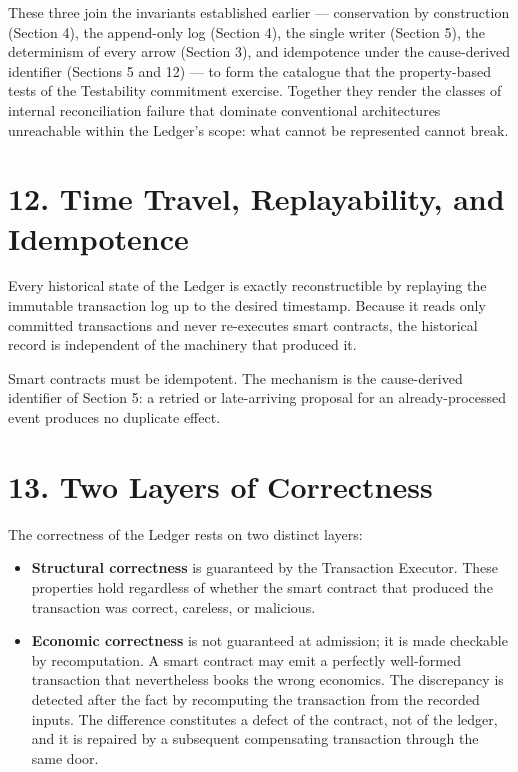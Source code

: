 \documentclass[11pt,a4paper]{article}
\providecommand{\tightlist}{\setlength{\itemsep}{2pt}\setlength{\parskip}{0pt}}
\begin{document}
These three join the invariants established earlier --- conservation by
construction (Section 4), the append-only log (Section 4), the single
writer (Section 5), the determinism of every arrow (Section 3), and
idempotence under the cause-derived identifier (Sections 5 and 12) ---
to form the catalogue that the property-based tests of the Testability
commitment exercise. Together they render the classes of internal
reconciliation failure that dominate conventional architectures
unreachable within the Ledger's scope: what cannot be represented cannot
break.

\hypertarget{time-travel-replayability-and-idempotence}{%
\section{12. Time Travel, Replayability, and
Idempotence}\label{time-travel-replayability-and-idempotence}}

Every historical state of the Ledger is exactly reconstructible by
replaying the immutable transaction log up to the desired timestamp.
Because it reads only committed transactions and never re-executes smart
contracts, the historical record is independent of the machinery that
produced it.

Smart contracts must be idempotent. The mechanism is the cause-derived
identifier of Section 5: a retried or late-arriving proposal for an
already-processed event produces no duplicate effect.

\hypertarget{two-layers-of-correctness}{%
\section{13. Two Layers of
Correctness}\label{two-layers-of-correctness}}

The correctness of the Ledger rests on two distinct layers:

\begin{itemize}
\tightlist
\item
  \textbf{Structural correctness} is guaranteed by the Transaction
  Executor. These properties hold regardless of whether the smart
  contract that produced the transaction was correct, careless, or
  malicious.
\item
  \textbf{Economic correctness} is not guaranteed at admission; it is
  made checkable by recomputation. A smart contract may emit a perfectly
  well-formed transaction that nevertheless books the wrong economics.
  The discrepancy is detected after the fact by recomputing the
  transaction from the recorded inputs. The difference constitutes a
  defect of the contract, not of the ledger, and it is repaired by a
  subsequent compensating transaction through the same door.
\end{itemize}
\end{document}
